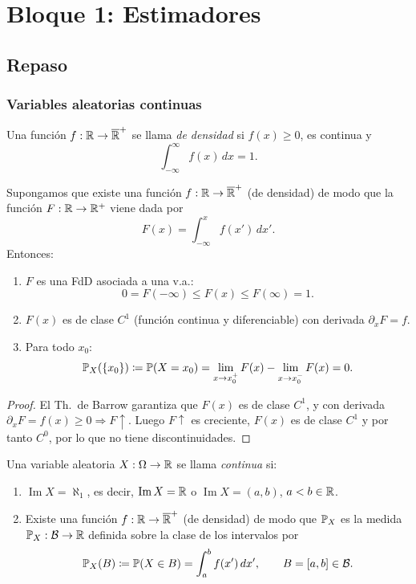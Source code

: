 
\part*{Bloque 1: Estimadores} \setcounter{chapter}{-1}
\chapter{Repaso}
\section{Variables aleatorias continuas}

\begin{definicion}[29]
Una función $f : \mathbb{R} \to \overline{\mathbb{R}}^+$ se llama \emph{de densidad} si $f(x) \ge 0$, es continua y
\[
  \int_{-\infty}^{\infty} f(x)\,dx = 1.
\]
\end{definicion}

\begin{proposicion}[55]
Supongamos que existe una función $f : \mathbb{R} \to \overline{\mathbb{R}}^+$ (de densidad) de modo que la función $F : \mathbb{R} \to \mathbb{R}^+$ viene dada por
\[
  F(x) = \int_{-\infty}^{x} f(x')\,dx'.
\]
Entonces:
\begin{enumerate}[label=(\alph*)]
  \item $F$ es una FdD asociada a una v.a.:
        \[
          0 = F(-\infty) \le F(x) \le F(\infty) = 1.
        \]
  \item $F(x)$ es de clase $C^1$ (función continua y diferenciable) con derivada $\partial_x F = f$.
  \item Para todo $x_0$:
        \[
          \mathbb{P}_X(\{x_0\}) \coloneqq \mathbb{P}(X = x_0) = \lim_{x \to x_0^+} F(x) - \lim_{x \to x_0^-} F(x) = 0.
        \]
\end{enumerate}
\end{proposicion}

\begin{proof}
El Th.\ de Barrow garantiza que $F(x)$ es de clase $C^1$, y con derivada $\partial_x F = f(x) \ge 0 \Rightarrow F\uparrow$. Luego $F\uparrow$ es creciente, $F(x)$ es de clase $C^1$ y por tanto $C^0$, por lo que no tiene discontinuidades.
\end{proof}

\begin{definicion}[30]
Una variable aleatoria $X : \Omega \to \mathbb{R}$ se llama \emph{continua} si:
\begin{enumerate}[label=(\alph*)]
  \item $\operatorname{Im} X = \aleph_1$, es decir, $\operatorname{Im} X = \mathbb{R}$ o $\operatorname{Im} X = (a,b)$, $a < b \in \mathbb{R}$.
  \item Existe una función $f : \mathbb{R} \to \overline{\mathbb{R}}^+$ (de densidad) de modo que $\mathbb{P}_X$ es la medida $\mathbb{P}_X : \mathcal{B} \to \mathbb{R}$ definida sobre la clase de los intervalos por
        \[
          \mathbb{P}_X(B) \coloneqq \mathbb{P}(X \in B) = \int_a^b f(x')\,dx', \qquad B = [a,b] \in \mathcal{B}.
        \]
\end{enumerate}
\end{definicion}

